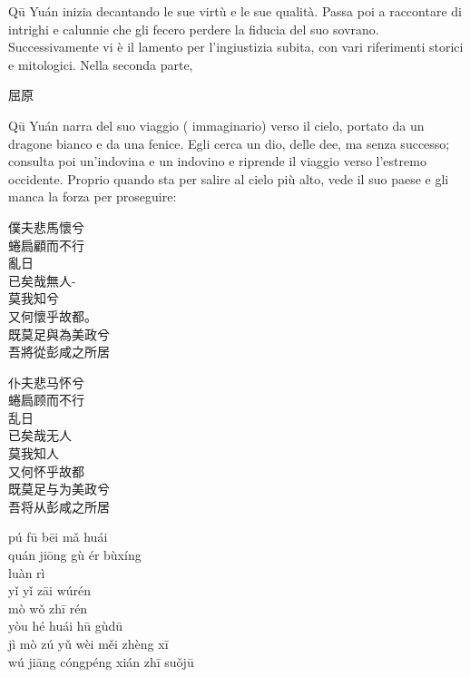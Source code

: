 \documentclass[12pt,titlepage]{article}
\begin{document}
Qū Yuán inizia decantando le sue virtù e le sue qualità. Passa poi a raccontare di intrighi e calunnie che gli fecero perdere la fiducia del suo sovrano. Successivamente vi è il lamento per l'ingiustizia subita, con vari riferimenti storici e mitologici. Nella seconda parte,
 \begin{CJK*}{UTF8}{gbsn}屈原\end{CJK*}
  Qū Yuán narra del suo viaggio ( immaginario) verso il cielo, portato da un dragone bianco e da una fenice. Egli cerca un dio, delle dee, ma senza successo; consulta poi un'indovina e un indovino e riprende il viaggio verso l'estremo occidente. Proprio quando sta per salire al cielo più alto, vede il suo paese e gli manca la forza per proseguire:
  \newpage
\begin{multicols}{3}
 \begin{CJK*}{UTF8}{gbsn}
 \hspace{-1.5em}僕夫悲馬懷兮\\
 蜷扃顧而不行\\
 亂日\\
 已矣哉無人-\\
 莫我知兮\\
 又何懷乎故都。\\
 既莫足與為美政兮 \\
吾將從彭咸之所居\footnotemark

\end{CJK*}
\columnbreak

 \begin{CJK*}{UTF8}{gbsn}
\hspace{-1.5em}仆夫悲马怀兮\\
 蜷扃顾而不行\\
 乱日\\
已矣哉无人\\
莫我知人\\
 又何怀乎故都\\
既莫足与为美政兮 \\
吾将从彭咸之所居\\
\end{CJK*}
\columnbreak

\hspace{-1.5em}pú fū bēi mǎ huái \\
quán jiōng gù ér bùxíng\\
luàn rì	\\
yǐ yǐ zāi wúrén	\\
mò wǒ zhī rén	\\
yòu hé huái hū gùdū\\
jì mò zú yǔ wèi měi zhèng xī\\
wú jiāng cóngpéng xián zhī suǒjū\\
\columnbreak
\end{multicols}
\end{document}
